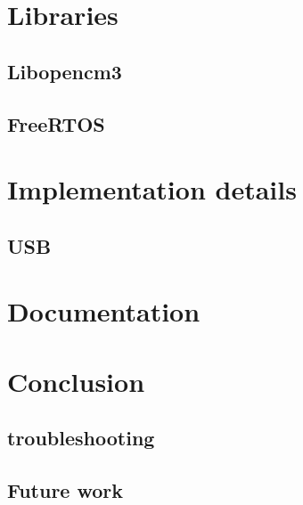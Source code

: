 \documentclass[12pt,a4paper]{report}
\begin{document}
\chapter{Libraries}
\section{Libopencm3}
\label{sec:libopencm3}
\section{FreeRTOS}
\label{sec:freeRTOS}
\chapter{Implementation details}
\section{USB}
\chapter{Documentation}
\chapter{Conclusion}
\section{troubleshooting}
\section{Future work}
 

\end{document}
